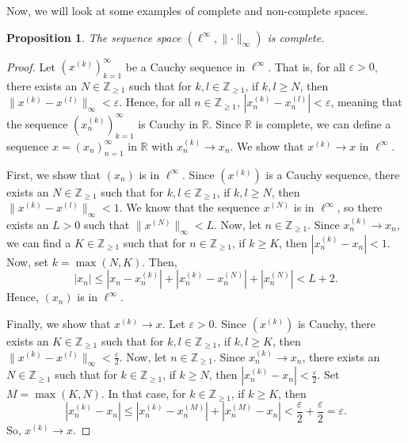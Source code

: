 \documentclass[a4paper, openany]{memoir}
\theoremstyle{definition}
\theoremstyle{plain}
\newtheorem{proposition}[definition]{Proposition}
\begin{document}
    Now, we will look at some examples of complete and non-complete spaces.
    \begin{proposition}
        The sequence space $(\ell^\infty, \lVert \cdot \rVert_\infty)$ is complete.
    \end{proposition}
    \begin{proof}
        Let $(x^{(k)})_{k=1}^\infty$ be a Cauchy sequence in $\ell^\infty$. That is, for all $\varepsilon > 0$, there exists an $N \in \mathbb{Z}_{\geq 1}$ such that for $k, l \in \mathbb{Z}_{\geq 1}$, if $k, l \geq N$, then $\lVert x^{(k)} - x^{(l)} \rVert_\infty < \varepsilon$. Hence, for all $n \in \mathbb{Z}_{\geq 1}$, $|x^{(k)}_n - x^{(l)}_n| < \varepsilon$, meaning that the sequence $(x^{(k)}_n)_{k=1}^\infty$ is Cauchy in $\mathbb{R}$. Since $\mathbb{R}$ is complete, we can define a sequence $x = (x_n)_{n=1}^\infty$ in $\mathbb{R}$ with $x^{(k)}_n \to x_n$. We show that $x^{(k)} \to x$ in $\ell^\infty$.

        First, we show that $(x_n)$ is in $\ell^\infty$. Since $(x^{(k)})$ is a Cauchy sequence, there exists an $N \in \mathbb{Z}_{\geq 1}$ such that for $k, l \in \mathbb{Z}_{\geq 1}$, if $k, l \geq N$, then $\lVert x^{(k)} - x^{(l)} \rVert_\infty < 1$. We know that the sequence $x^{(N)}$ is in $\ell^\infty$, so there exists an $L > 0$ such that $\lVert x^{(N)} \rVert_\infty < L$. Now, let $n \in \mathbb{Z}_{\geq 1}$. Since $x^{(k)}_n \to x_n$, we can find a $K \in \mathbb{Z}_{\geq 1}$ such that for $n \in \mathbb{Z}_{\geq 1}$, if $k \geq K$, then $|x^{(k)}_n - x_n| < 1$. Now, set $k = \max(N, K)$. Then,
        \[|x_n| \leq |x_n - x_n^{(k)}| + |x_n^{(k)} - x_n^{(N)}| + |x_n^{(N)}| < L + 2.\]
        Hence, $(x_n)$ is in $\ell^\infty$.
    
        Finally, we show that $x^{(k)} \to x$. Let $\varepsilon > 0$. Since $(x^{(k)})$ is Cauchy, there exists an $K \in \mathbb{Z}_{\geq 1}$ such that for $k, l \in \mathbb{Z}_{\geq 1}$, if $k, l \geq K$, then $\lVert x^{(k)} - x^{(l)} \rVert_\infty < \frac{\varepsilon}{2}$. Now, let $n \in \mathbb{Z}_{\geq 1}$. Since $x^{(k)}_n \to x_n$, there exists an $N \in \mathbb{Z}_{\geq 1}$ such that for $k \in \mathbb{Z}_{\geq 1}$, if $k \geq N$, then $|x^{(k)}_n - x_n| < \frac{\varepsilon}{2}$. Set $M = \max(K, N)$. In that case, for $k \in \mathbb{Z}_{\geq 1}$, if $k \geq K$, then
        \[|x^{(k)}_n - x_n| \leq |x^{(k)}_n - x^{(M)}_n| + |x^{(M)}_n - x_n| < \frac{\varepsilon}{2} + \frac{\varepsilon}{2} = \varepsilon.\]
        So, $x^{(k)} \to x$.
    \end{proof}
\end{document}
